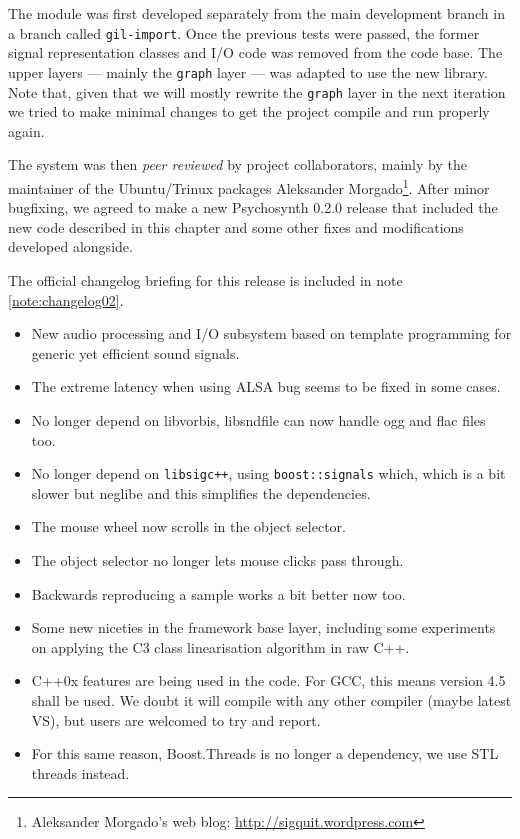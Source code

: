 The module was first developed separately from the main development
branch in a branch called \texttt{gil-import}. Once the previous tests
were passed, the former signal representation classes and I/O code was
removed from the code base. The upper layers --- mainly the
\texttt{graph} layer --- was adapted to use the new library. Note
that, given that we will mostly rewrite the \texttt{graph} layer in
the next iteration we tried to make minimal changes to get the project
compile and run properly again.

The system was then \emph{peer reviewed} by project collaborators,
mainly by the maintainer of the Ubuntu/Trinux packages Aleksander
Morgado\footnote{Aleksander Morgado's web blog:
  \url{http://sigquit.wordpress.com}}. After minor bugfixing, we
agreed to make a new Psychosynth 0.2.0 release that included the new
code described in this chapter and some other fixes and modifications
developed alongside.

The official changelog briefing for this release is included in note
\ref{note:changelog02}.

\begin{mynote}
\label{note:changelog02}
\begin{itemize}
\item New audio processing and I/O subsystem based on template programming
for generic yet efficient sound signals.

\item The extreme latency when using ALSA bug seems to be fixed in
  some cases.

\item No longer depend on libvorbis, libsndfile can now handle ogg and flac
files too.

\item No longer depend on \texttt{libsigc++}, using \texttt{boost::signals}
  which, which is a bit slower but neglibe and this simplifies the
  dependencies.

\item The mouse wheel now scrolls in the object selector.

\item The object selector no longer lets mouse clicks pass through.  

\item Backwards reproducing a sample works a bit better now too.

\item Some new niceties in the framework base layer, including some
  experiments on applying the C3 class linearisation algorithm in raw
  C++.

\item C++0x features are being used in the code. For GCC, this means
  version 4.5 shall be used. We doubt it will compile with any other
  compiler (maybe latest VS), but users are welcomed to try and report.

\item For this same reason, Boost.Threads is no longer a dependency,
  we use STL threads instead.
\end{itemize}
\end{mynote}

